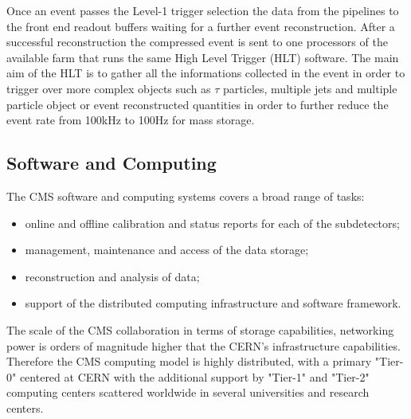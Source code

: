 Once an event passes the Level-1 trigger selection the data from the pipelines to the front end readout buffers waiting for a further event reconstruction. After a successful reconstruction the compressed event is sent to one processors of the available farm that runs the same High Level Trigger (HLT) software. The main aim of the HLT is to gather all the informations collected in the event in order to trigger over more complex objects such as $\tau$ particles, multiple jets and multiple particle object or event reconstructed quantities in order to further reduce the event rate from 100kHz to 100Hz for mass storage.

\clearpage

\subsection{Software and Computing}

The CMS software and computing systems covers a broad range of tasks:

\begin{itemize}
	\item online and offline calibration and status reports for each of the subdetectors;
	\item management, maintenance and access of the data storage;
	\item reconstruction and analysis of data;
	\item support of the distributed computing infrastructure and software framework.
\end{itemize}

The scale of the CMS collaboration in terms of storage capabilities, networking power is orders of magnitude higher that the CERN's infrastructure capabilities. Therefore the CMS computing model is highly distributed, with a primary "Tier-0" centered at CERN with the additional support by "Tier-1" and "Tier-2" computing centers scattered worldwide in several universities and research centers. 

